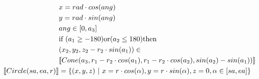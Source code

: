 \documentclass[11pt,draft,a4paper]{article}%
\newcommand{\setsep}[2]{\{#1~|~#2\}}
\newcommand{\leftsem}{[\![} %
\newcommand{\rightsem}{]\!]} %
\newcommand{\setsem}[1]{\leftsem #1 \rightsem} %
\begin{document}
\begin{align}
& x = rad\cdot cos (ang) \notag\\
& y = rad\cdot sin (ang) \notag\\
& ang \in [0, a_3] \notag\\
& \text{if } (a_1 \geq -180) \text{or} (a_2 \leq 180) \text {then} \notag\\
& (x_2,y_2,z_2 - r_2 \cdot sin(a_1)) \in \notag\\
&\setsem{Cone(a_3, r_1 - r_2 \cdot cos(a_1), r_1 - r_2 \cdot cos(a_2), sin(a_2) - sin(a_1))}\\
\setsem{Circle(sa, ea, r)} & = \setsep{(x,y,z)}{x = r\cdot cos(\alpha), y = r \cdot sin(\alpha), z = 0, \alpha \in [sa, ea]}\\
\end{align}
\end{document}
